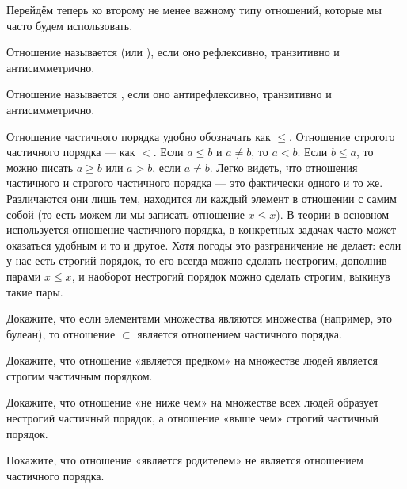 Перейдём теперь ко второму не менее важному типу отношений, которые мы часто будем использовать.

\begin{definition}
Отношение называется  (или ), если оно рефлексивно, транзитивно и антисимметрично.
\end{definition}

\begin{definition}
Отношение называется , если оно антирефлексивно, транзитивно и антисимметрично.
\end{definition}

Отношение частичного порядка удобно обозначать как $\le$. Отношение строгого частичного порядка — как $<$. Если $a \le b$ и $a \not= b$, то $a<b$. Если $b \le a$, то можно писать $a \ge b$ или $a > b$, если $a\not= b$. Легко видеть, что отношения частичного и строгого частичного порядка — это фактически одного и то же. Различаются они лишь тем, находится ли каждый элемент в отношении с самим собой (то есть можем ли мы записать отношение $x\le x$). В теории в основном используется отношение частичного порядка, в конкретных задачах часто может оказаться удобным и то и другое. Хотя погоды это разграничение не делает: если у нас есть строгий порядок, то его всегда можно сделать нестрогим, дополнив парами $x\le x$, и наоборот нестрогий порядок можно сделать строгим, выкинув такие пары.

\begin{exercise}
Докажите, что если элементами множества являются множества (например, это булеан), то отношение $\subset$ является отношением частичного порядка.
\end{exercise}

\begin{exercise}
Докажите, что отношение «является предком» на множестве людей является строгим частичным порядком.
\end{exercise}

\begin{exercise}
Докажите, что отношение «не ниже чем» на множестве всех людей образует нестрогий частичный порядок, а отношение «выше чем» строгий частичный порядок.
\end{exercise}

\begin{exercise}
Покажите, что отношение «является родителем» не является отношением частичного порядка.
\end{exercise}

